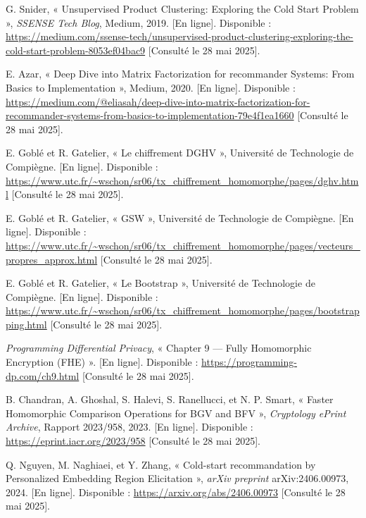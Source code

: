 \documentclass{article}
\begin{document}
\begin{thebibliography}{99}
    G. Snider, « Unsupervised Product Clustering: Exploring the Cold Start Problem », \emph{SSENSE Tech Blog}, Medium, 2019. [En ligne]. Disponible : \url{https://medium.com/ssense-tech/unsupervised-product-clustering-exploring-the-cold-start-problem-8053ef04bac9} [Consulté le 28 mai 2025].

    E. Azar, « Deep Dive into Matrix Factorization for recommander Systems: From Basics to Implementation », Medium, 2020. [En ligne]. Disponible : \url{https://medium.com/@eliasah/deep-dive-into-matrix-factorization-for-recommander-systems-from-basics-to-implementation-79e4f1ea1660} [Consulté le 28 mai 2025].

    E. Goblé et R. Gatelier, « Le chiffrement DGHV », Université de Technologie de Compiègne. [En ligne]. Disponible : \url{https://www.utc.fr/~wschon/sr06/tx_chiffrement_homomorphe/pages/dghv.html} [Consulté le 28 mai 2025].

    E. Goblé et R. Gatelier, « GSW », Université de Technologie de Compiègne. [En ligne]. Disponible : \url{https://www.utc.fr/~wschon/sr06/tx_chiffrement_homomorphe/pages/vecteurs_propres_approx.html} [Consulté le 28 mai 2025].

    E. Goblé et R. Gatelier, « Le Bootstrap », Université de Technologie de Compiègne. [En ligne]. Disponible : \url{https://www.utc.fr/~wschon/sr06/tx_chiffrement_homomorphe/pages/bootstrapping.html} [Consulté le 28 mai 2025].

    \emph{Programming Differential Privacy}, « Chapter 9 — Fully Homomorphic Encryption (FHE) ». [En ligne]. Disponible : \url{https://programming-dp.com/ch9.html} [Consulté le 28 mai 2025].

    B. Chandran, A. Ghoshal, S. Halevi, S. Ranellucci, et N. P. Smart, « Faster Homomorphic Comparison Operations for BGV and BFV », \emph{Cryptology ePrint Archive}, Rapport 2023/958, 2023. [En ligne]. Disponible : \url{https://eprint.iacr.org/2023/958} [Consulté le 28 mai 2025].

    Q. Nguyen, M. Naghiaei, et Y. Zhang, « Cold-start recommandation by Personalized Embedding Region Elicitation », \emph{arXiv preprint} arXiv:2406.00973, 2024. [En ligne]. Disponible : \url{https://arxiv.org/abs/2406.00973} [Consulté le 28 mai 2025].

\end{thebibliography}
\end{document}
